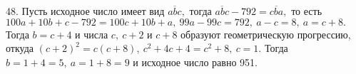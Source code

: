 48. Пусть исходное число имеет вид $\overline{abc},$ тогда
$\overline{abc}-792=\overline{cba},$ то есть
$100a+10b+c-792=100c+10b+a,\ 99a-99c=792,\ a-c=8,\ a=c+8.$ Тогда $b=c+4$ и числа $c,\ c+2$ и $c+8$ образуют геометрическую прогрессию, откуда $(c+2)^2=c(c+8),\ c^2+4c+4=c^2+8,\ c=1.$ Тогда $b=1+4=5,\ a=1+8=9$ и исходное число равно 951.\\
